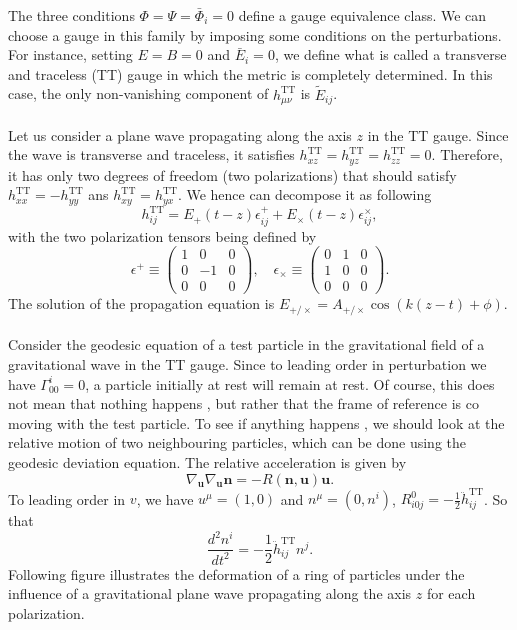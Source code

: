 \documentclass[cyan]{elegantnote}
\begin{document}
The three conditions $\Phi = \Psi = \bar{\Phi}_i = 0$ define a gauge equivalence class. We can choose a gauge in this family by imposing some conditions on the perturbations. For instance, setting $E = B = 0$ and $\bar{E}_i = 0$, we define what is called a transverse and traceless (TT) gauge in which the metric is completely determined. In this case, the only non-vanishing component of $h_{\mu\nu}^{\mathrm{TT}}$ is $\tilde{E}_{ij}$.
\\ \\
Let us consider a plane wave propagating along the axis $z$ in the TT gauge. Since the wave is transverse and traceless, it satisfies $h_{xz}^{\mathrm{TT}} = h_{yz}^{\mathrm{TT}} = h_{zz}^{\mathrm{TT}} = 0$. Therefore, it has only two degrees of freedom (two polarizations) that should satisfy $h_{xx}^{\mathrm{TT}} = - h_{yy}^{\mathrm{TT}}$ ans $h_{xy}^{\mathrm{TT}} = h_{yx}^{\mathrm{TT}}$. We hence can decompose it as following
\[h_{ij}^{\mathrm{TT}} = E_+(t-z)\epsilon^+_{ij} + E_{\times}(t-z)\epsilon^{\times}_{ij},\]
with the two polarization tensors being defined by
\[\epsilon^+ \equiv \begin{pmatrix}
1 & 0 & 0\\ 0 & -1 & 0 \\ 0 & 0 & 0
\end{pmatrix} , \quad \epsilon_{\times} \equiv \begin{pmatrix}
0 & 1 & 0\\ 1 & 0 & 0 \\ 0 & 0 & 0
\end{pmatrix} .\]
The solution of the propagation equation is $E_{+ / \times} = A_{+ / \times}\cos(k(z-t)+ \phi)$.
\\ \\
Consider the geodesic equation of a test particle in the gravitational field of a gravitational wave in the TT gauge. Since to leading order in perturbation we have $\Gamma^i_{00} = 0$, a particle initially at rest will remain at rest.
Of course, this does not mean that nothing happens , but rather that the frame of reference is co moving with the test particle. To see if anything happens , we should look at the relative motion of two neighbouring particles, which can be done using the geodesic deviation equation. The relative acceleration is given by
\[\nabla_{\bm{u}} \nabla_{\bm{u}} \bm{n} = -R(\bm{n},\bm{u}) \bm{u}.\]
To leading order in $v$, we have $u^{\mu} = (1,0)$ and $n^{\mu} = (0,n^i)$, $R^0_{i0j} = -\frac{1}{2}\ddot{h}_{ij}^{\mathrm{TT}}$. So that
\[\frac{d^2n^i}{dt^2} = -\frac{1}{2} \ddot{h}_{ij} ^{\mathrm{TT}} n^j.\]
Following figure illustrates the deformation of a ring of particles under the influence of a gravitational plane wave propagating along the axis $z$ for each polarization.
\end{document}
